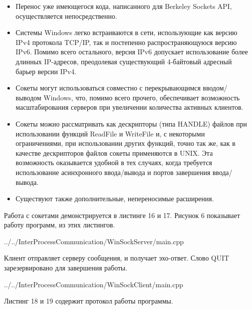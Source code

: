 \documentclass[a4paper, 12pt]{report}		%
\begin{document}
\begin{itemize}
\item Перенос уже имеющегося кода, написанного для Berkeley Sockets API, осуществляется непосредственно.

\item Системы Windows легко встраиваются в сети, использующие как версию IPv4 протокола TCP/IP, так и постепенно распространяющуюся версию IPv6. Помимо всего остального, версия IPv6 допускает использование более длинных IP-адресов, преодолевая существующий 4-байтовый адресный барьер версии IPv4.

\item Сокеты могут использоваться совместно с перекрывающимся вводом/выводом Windows, что, помимо всего прочего, обеспечивает возможность масштабирования серверов при увеличении количества активных клиентов.

\item Сокеты можно рассматривать как дескрипторы (типа HANDLE) файлов при использовании функций ReadFile и WriteFile и, с некоторыми ограничениями, при использовании других функций, точно так же, как в качестве дескрипторов файлов сокеты применяются в UNIX. Эта возможность оказывается удобной в тех случаях, когда требуется использование асинхронного ввода/вывода и портов завершения ввода/вывода.

\item Существуют также дополнительные, непереносимые расширения.
\end{itemize}

Работа с сокетами демонстрируется в листинге 16 и 17. Рисунок 6 показывает работу программ, из этих листингов.



{../../InterProcessCommunication/WinSockServer/main.cpp}

Клиент отправляет серверу сообщения, и получает эхо-ответ. Слово QUIT зарезервировано для завершения работы.


{../../InterProcessCommunication/WinSockClient/main.cpp}

Листинг 18 и 19 содержит протокол работы программы.




\end{document}

